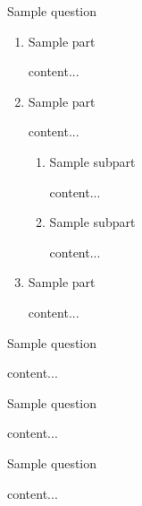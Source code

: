 \documentclass[11pt]{article} %
\begin{document}
	\renewcommand*{\CourseCodeAN}{CLASS 000 - Assignment\#0} %
	\renewcommand*{\AssignmentDate}{00 MONTH 2018} %
	
	\pagestyle{Assignment}
	\fancyhfoffset[L,O]{0pt} %

	\begin{qstn}[1][][10] %
		Sample question
	\begin{enumerate}[label=\protect\circled{\Alph*}]
		\item Sample part
		\begin{soln}
			content...
		\end{soln}
		\item Sample part
		\begin{soln}
			content...
		\end{soln}
		\begin{enumerate}[label=\protect\circled{\roman*}]
			\item Sample subpart
			\begin{soln}
				content...
			\end{soln}
			\item Sample subpart
			\begin{soln}
				content...
			\end{soln}
		\end{enumerate}
			\item Sample part
		\begin{soln}
			content...
		\end{soln}
	\end{enumerate}
	\end{qstn}
	
	\begin{qstn}[2][][10]
		Sample question
	\begin{soln}
		content...
	\end{soln}
	\end{qstn}
	
	\begin{qstn}[3][][10]
		Sample question
	\begin{soln}
		content...
	\end{soln}
	\end{qstn}
	
	\begin{qstn}[4][][10]
		Sample question
	\begin{soln}
		content...
	\end{soln}
	\end{qstn}
	
\end{document}
